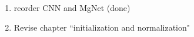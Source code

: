\begin{enumerate}
\item reorder CNN and MgNet (done)
\item Revise chapter ``initialization and normalization" 
\end{enumerate}